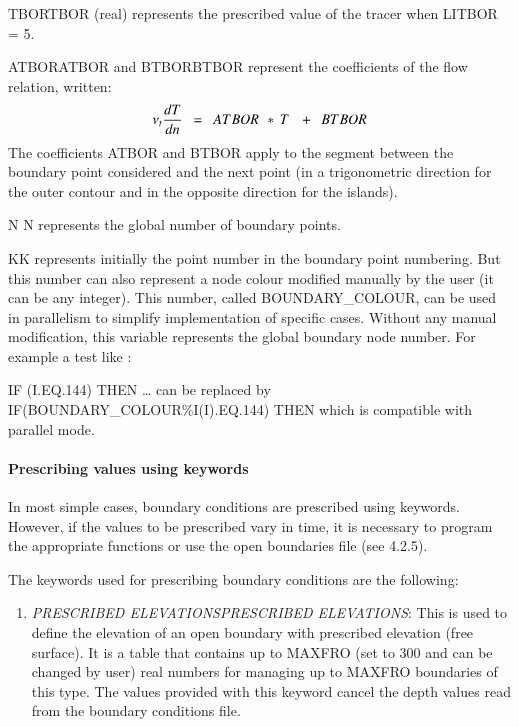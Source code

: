 \documentclass{article} %
\begin{document}
 TBORTBOR (real) represents the prescribed value of the tracer when LITBOR = 5.

 ATBORATBOR and BTBORBTBOR represent the coefficients of the flow relation, written:
\[\nu _{t} \frac{dT}{dn} {\kern 1pt} {\kern 1pt} {\kern 1pt} {\kern 1pt} {\kern 1pt} ={\kern 1pt} {\kern 1pt} {\kern 1pt} {\kern 1pt} {\kern 1pt} ATBOR{\kern 1pt} {\kern 1pt} {\kern 1pt} {\kern 1pt} *{\kern 1pt} {\kern 1pt} T{\kern 1pt} {\kern 1pt} {\kern 1pt} {\kern 1pt} {\kern 1pt} {\kern 1pt} {\kern 1pt} +{\kern 1pt} {\kern 1pt} {\kern 1pt} {\kern 1pt} {\kern 1pt} BTBOR\]
The coefficients ATBOR and BTBOR apply to the segment between the boundary point considered and the next point (in a trigonometric direction for the outer contour and in the opposite direction for the islands).

 N N represents the global number of boundary points.

 KK represents initially the point number in the boundary point numbering. But this number can also represent a node colour modified manually by the user (it can be any integer). This number, called BOUNDARY\_COLOUR, can be used in parallelism to simplify implementation of specific cases. Without any manual modification, this variable represents the global boundary node number. For example a test like :

 IF (I.EQ.144) THEN {\dots} can be replaced by IF(BOUNDARY\_COLOUR\%I(I).EQ.144) THEN which is compatible with parallel mode.


\paragraph{ Prescribing values using keywords}

 In most simple cases, boundary conditions are prescribed using keywords. However, if the values to be prescribed vary in time, it is necessary to program the appropriate functions or use the open boundaries file (see 4.2.5).

 The keywords used for prescribing boundary conditions are the following:

\begin{enumerate}
\item  \textit{PRESCRIBED ELEVATIONSPRESCRIBED ELEVATIONS}: This is used to define the elevation of an open boundary with prescribed elevation (free surface). It is a table that contains up to MAXFRO (set to 300 and can be changed by user) real numbers for managing up to MAXFRO boundaries of this type. The values provided with this keyword cancel the depth values read from the boundary conditions file.
\end{enumerate}
\end{document}
